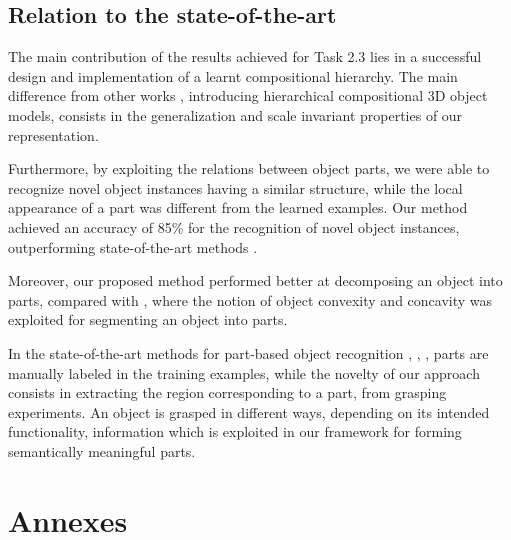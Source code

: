 \documentclass[a4paper,11pt,pdf]{pacmanreport}
\begin{document}
\subsection{Relation to the state-of-the-art}

The main contribution of the results achieved for Task 2.3 lies in a successful design and implementation of a learnt compositional hierarchy. The main difference from other works \cite{rel2},\cite{comp2} introducing hierarchical compositional 3D object models, consists in the generalization and scale invariant properties of our representation. 

Furthermore, by exploiting the relations between object parts, we were able to recognize novel object instances having a similar structure, while the local appearance of a part was different from the learned examples. Our method achieved an accuracy of 85\% for the recognition of novel object instances, outperforming state-of-the-art methods \cite{vfh}. 

Moreover, our proposed method performed better at decomposing an object into parts, compared with \cite{rel7}, where the notion of object convexity and concavity was exploited for segmenting an object into parts.

In the state-of-the-art methods for part-based object recognition \cite{part2}, \cite{part1}, \cite{part3}, parts are manually labeled in the training examples, while the novelty of our approach consists in extracting the region corresponding to a part, from grasping experiments. An object is grasped in different ways, depending on its intended functionality, information which is exploited in our framework for forming semantically meaningful parts.

\newpage




\newpage 

\appendix 

\section{Annexes}

\end{document}
